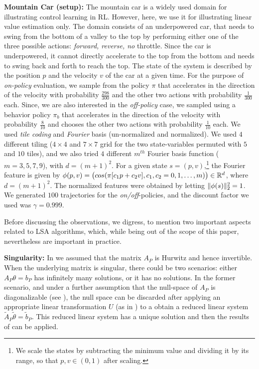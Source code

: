 \textbf{Mountain Car (setup):}  The mountain car is a widely used domain for illustrating control learning in RL.
However, here, we use it for illustrating linear value estimation only. The domain consists of an underpowered car, that needs to swing from the bottom of a valley to the top by performing either one of the three possible actions: \emph{forward, reverse, no} throttle. Since the car is underpowered, it cannot directly accelerate to the top from the bottom and needs to swing back and forth to reach the top. The state of the system is described by the position $p$ and the velocity $v$ of the car at a given time. For the purpose of \emph{on-policy} evaluation, we sample from the policy $\pi$ that accelerates in the direction of the velocity with probability $\frac{298}{300}$ and the other two actions with probability $\frac{1}{300}$ each. Since, we are also interested in the \emph{off-policy} case, we sampled using a behavior policy $\pi_b$ that accelerates in the direction of the velocity with probability $\frac{8}{10}$ and chooses the other two actions with probability $\frac{1}{10}$ each. We used \emph{tile coding} and \emph{Fourier} basis (un-normalized and normalized). We used $4$ different tiling ($4\times 4$ and $7\times 7$ grid for the two state-variables permuted with $5$ and $10$ tiles), and we also tried $4$ different $m^{th}$ Fourier basis function ($m=3,5,7,9$), with $d=(m+1)^2$. For a given state $s=(p,v)$,\footnote{We scale the states by subtracting the minimum value and dividing it by its range, so that $p,v\in(0,1)$ after scaling.} the Fourier feature is given by $\phi(p,v)=\big(cos(\pi [c_1p+c_2 v],c_1,c_2=0,1,\ldots,m)\big) \in \mathbb{R}^{d}$, where $d=(m+1)^2$. The normalized features were obtained by letting $\| \phi(s)\|^2_2=1$. We generated $100$ trajectories for the \emph{on/off}-policies, and the discount factor we used was $\gamma=0.999$. 

Before discussing the observations, we digress, to mention two important aspects related to LSA algorithms, which, while being out of the scope of this paper, nevertheless are important in practice.

\textbf{Singularity:} In  we assumed that the matrix $A_P$ is Hurwitz and hence invertible. When the underlying matrix is singular, there could be two scenarios: either $A_P\theta=b_P$ has infinitely many solutions, or it has no solutions. In the former scenario, and under a further assumption that the null-space of $A_P$ is diagonalizable (see \cite{bertstab}), the null space can be discarded after applying an appropriate linear transformation $U$ (as in ) to a obtain a reduced linear system $\tilde{A}_P\tilde{\theta}=\tilde{b}_P$. This reduced linear system has a unique solution and then the results of  can be applied.

